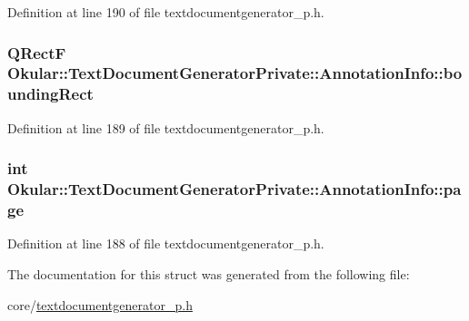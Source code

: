 Definition at line 190 of file textdocumentgenerator\+\_\+p.\+h.

\hypertarget{structOkular_1_1TextDocumentGeneratorPrivate_1_1AnnotationInfo_a0114d0b084bc4355896079831c23f327}{
\subsubsection[{bounding\+Rect}]{\setlength{\rightskip}{0pt plus 5cm}Q\+Rect\+F Okular\+::\+Text\+Document\+Generator\+Private\+::\+Annotation\+Info\+::bounding\+Rect}}\label{structOkular_1_1TextDocumentGeneratorPrivate_1_1AnnotationInfo_a0114d0b084bc4355896079831c23f327}


Definition at line 189 of file textdocumentgenerator\+\_\+p.\+h.

\hypertarget{structOkular_1_1TextDocumentGeneratorPrivate_1_1AnnotationInfo_a35a51f7a8d879d6196761cb6f34e2418}{
\subsubsection[{page}]{\setlength{\rightskip}{0pt plus 5cm}int Okular\+::\+Text\+Document\+Generator\+Private\+::\+Annotation\+Info\+::page}}\label{structOkular_1_1TextDocumentGeneratorPrivate_1_1AnnotationInfo_a35a51f7a8d879d6196761cb6f34e2418}


Definition at line 188 of file textdocumentgenerator\+\_\+p.\+h.



The documentation for this struct was generated from the following file\+:\begin{DoxyCompactItemize}
\item 
core/\hyperlink{textdocumentgenerator__p_8h}{textdocumentgenerator\+\_\+p.\+h}\end{DoxyCompactItemize}
